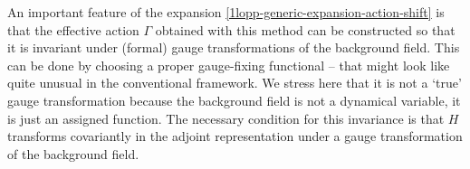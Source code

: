 

An important feature of the expansion \eqref{1lopp-generic-expansion-action-shift} is that the effective action $\Gamma$ obtained with this method can be constructed  so that it is invariant under (formal) gauge transformations of the background field. This can be done by choosing a proper gauge-fixing functional -- that might look like quite unusual in the conventional framework.  We stress here that it is not a `true' gauge transformation because the background field is not a dynamical variable, it is just an assigned function. The necessary condition for this invariance is that $H$ transforms covariantly in the adjoint representation under a gauge transformation of the background field.

